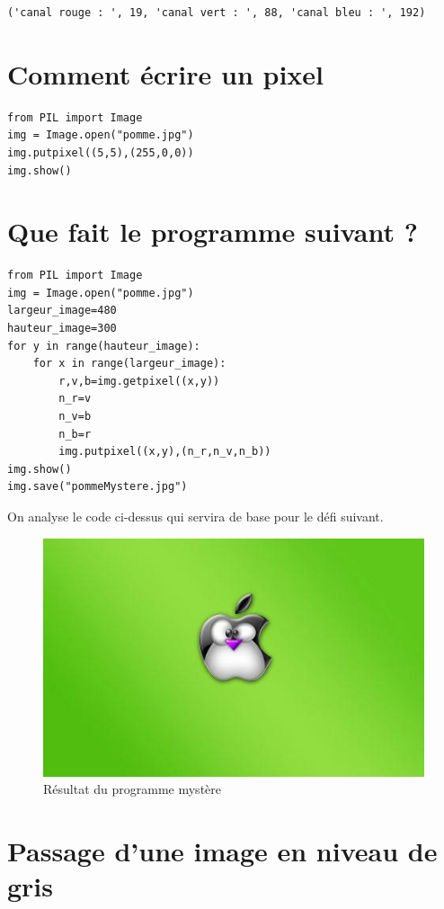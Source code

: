 \documentclass[11pt]{article}
\begin{document}
\begin{verbatim}
('canal rouge : ', 19, 'canal vert : ', 88, 'canal bleu : ', 192)
\end{verbatim}


\section{Comment écrire un pixel}
\label{sec:org8869b37}

\begin{verbatim}
from PIL import Image
img = Image.open("pomme.jpg")
img.putpixel((5,5),(255,0,0))
img.show()
\end{verbatim}


\section{Que fait le programme suivant ?}
\label{sec:orgf4386f6}

\begin{verbatim}
from PIL import Image
img = Image.open("pomme.jpg")
largeur_image=480
hauteur_image=300
for y in range(hauteur_image):
    for x in range(largeur_image):
        r,v,b=img.getpixel((x,y))
        n_r=v
        n_v=b
        n_b=r
        img.putpixel((x,y),(n_r,n_v,n_b))
img.show()
img.save("pommeMystere.jpg")
\end{verbatim}


On analyse le code ci-dessus qui servira de base pour le défi suivant.

\begin{figure}[htbp]
\centering
\includegraphics[width=.9\linewidth]{pommeMystere.jpg}
\caption{Résultat du programme mystère}
\end{figure}


\section{Passage d'une image en niveau de gris}
\label{sec:org15181f8}
\end{document}
